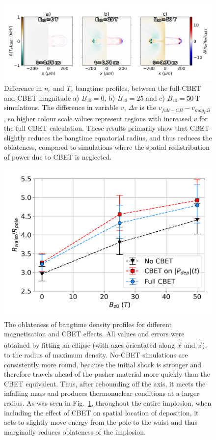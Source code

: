 \begin{figure}[t!]
    \includegraphics[width=\linewidth]{Results2/Images/CBETshape_stag_diff.png}
    \centering
    \caption{Difference in $n_e$ and $T_e$ bangtime profiles, between the full-\ac{CBET} and \ac{CBET}-magnitude a) $B_{z0}=0$, b) $B_{z0}=25$ and c) $B_{z0}=50\ \text{T}$ simulations.
    The difference in variable $v$, $\Delta v$ is the $v_{full-CB}-v_{mag_CB}$, so higher colour scale values represent regions with increased $v$ for the full \ac{CBET} calculation.
    These results primarily show that \ac{CBET} slightly reduces the bangtime equatorial radius, and thus reduces the oblateness, compared to simulations where the spatial redistribution of power due to \ac{CBET} is neglected.}%
    \label{fig:Res2_CBETshape_diff}
\end{figure}

\begin{figure}[t!]
    \includegraphics[width=0.6\linewidth]{Results2/Images/R2R0_errors.png}
    \centering
    \caption{The oblateness of bangtime density profiles for different magnetisation and \ac{CBET} effects.
    All values and errors were obtained by fitting an ellipse (with axes orientated along $\hat{\vec{x}}$ and $\hat{\vec{z}}$), to the radius of maximum density.
    No-\ac{CBET} simulations are consistently more round, because the initial shock is stronger and therefore travels ahead of the pusher material more quickly than the \ac{CBET} equivalent.
    Thus, after rebounding off the axis, it meets the infalling mass and produces thermonuclear conditions at a larger radius.
    As was seen in Fig.~\ref{fig:Res2_CBETshape_diff}, throughout the entire implosion, when including the effect of \ac{CBET} on spatial location of deposition, it acts to slightly move energy from the pole to the waist and thus marginally reduces oblateness of the implosion.}%
    \label{fig:Res2_R2R0_errors}
\end{figure}



